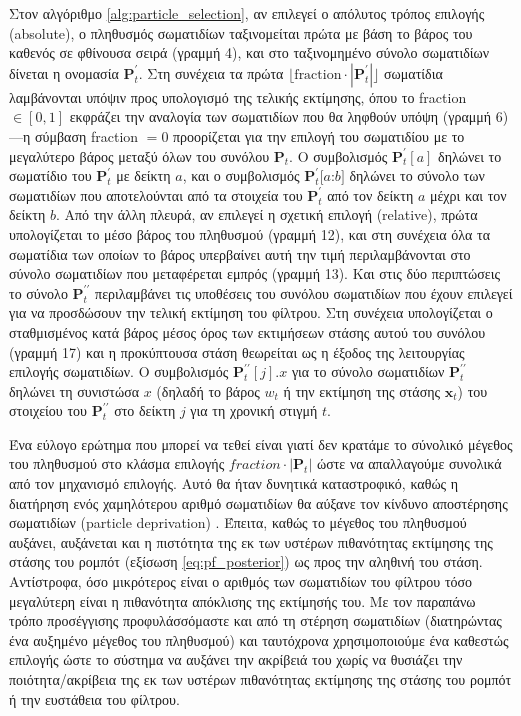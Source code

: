 Στον αλγόριθμο \ref{alg:particle_selection}, αν επιλεγεί ο απόλυτος τρόπος
επιλογής (absolute), ο πληθυσμός σωματιδίων ταξινομείται πρώτα με βάση το βάρος
του καθενός σε φθίνουσα σειρά (γραμμή 4), και στο ταξινομημένο σύνολο
σωματιδίων δίνεται η ονομασία $\bm{P}_t^\prime$. Στη συνέχεια τα πρώτα $\lfloor
\text{fraction}\cdot|\bm{P}_t^\prime| \rfloor$ σωματίδια λαμβάνονται υπόψιν
προς υπολογισμό της τελικής εκτίμησης, όπου το fraction $\in [0,1]$ εκφράζει
την αναλογία των σωματιδίων που θα ληφθούν υπόψη (γραμμή 6)---η σύμβαση
fraction $=0$ προορίζεται για την επιλογή του σωματιδίου με το μεγαλύτερο βάρος
μεταξύ όλων του συνόλου $\bm{P}_t$. Ο συμβολισμός $\bm{P}_t^\prime[a]$ δηλώνει
το σωματίδιο του $\bm{P}_t^\prime$ με δείκτη $a$, και ο συμβολισμός
$\bm{P}_t^\prime[a$:$b]$ δηλώνει το σύνολο των σωματιδίων που αποτελούνται από
τα στοιχεία του $\bm{P}_t^\prime$ από τον δείκτη $a$ μέχρι και τον δείκτη $b$.
Από την άλλη πλευρά, αν επιλεγεί η σχετική επιλογή (relative), πρώτα
υπολογίζεται το μέσο βάρος του πληθυσμού (γραμμή 12), και στη συνέχεια όλα τα
σωματίδια των οποίων το βάρος υπερβαίνει αυτή την τιμή περιλαμβάνονται στο
σύνολο σωματιδίων που μεταφέρεται εμπρός (γραμμή 13).  Και στις δύο περιπτώσεις
το σύνολο $\bm{P}_t^{\prime\prime}$ περιλαμβάνει τις υποθέσεις του συνόλου
σωματιδίων που έχουν επιλεγεί για να προσδώσουν την τελική εκτίμηση του
φίλτρου.  Στη συνέχεια υπολογίζεται ο σταθμισμένος κατά βάρος μέσος όρος των
εκτιμήσεων στάσης αυτού του συνόλου (γραμμή 17) και η προκύπτουσα στάση
θεωρείται ως η έξοδος της λειτουργίας επιλογής σωματιδίων. Ο συμβολισμός
$\bm{P}_t^{\prime\prime}[j].x$ για το σύνολο σωματιδίων
$\bm{P}_t^{\prime\prime}$ δηλώνει τη συνιστώσα $x$ (δηλαδή το βάρος $w_t$ ή την
εκτίμηση της στάσης $\hat{\bm{x}}_t$) του στοιχείου του
$\bm{P}_t^{\prime\prime}$ στο δείκτη $j$ για τη χρονική στιγμή $t$.

Ένα εύλογο ερώτημα που μπορεί να τεθεί είναι γιατί δεν κρατάμε το σύνολικό
μέγεθος του πληθυσμού στο κλάσμα επιλογής $fraction \cdot |\bm{P}_t|$ ώστε να
απαλλαγούμε συνολικά από τον μηχανισμό επιλογής. Αυτό θα ήταν δυνητικά
καταστροφικό, καθώς η διατήρηση ενός χαμηλότερου αριθμό σωματιδίων θα αύξανε
τον κίνδυνο αποστέρησης σωματιδίων (particle deprivation)
\cite{thrun2005probabilistic}. Έπειτα, καθώς το μέγεθος του πληθυσμού αυξάνει,
αυξάνεται και η πιστότητα της εκ των υστέρων πιθανότητας εκτίμησης της στάσης
του ρομπότ (εξίσωση \ref{eq:pf_posterior}) ως προς την αληθινή του στάση.
Αντίστροφα, όσο μικρότερος είναι ο αριθμός των σωματιδίων του φίλτρου τόσο
μεγαλύτερη είναι η πιθανότητα απόκλισης της εκτίμησής του. Με τον παραπάνω
τρόπο προσέγγισης προφυλάσσόμαστε και από τη στέρηση σωματιδίων (διατηρώντας
ένα αυξημένο μέγεθος του πληθυσμού) και ταυτόχρονα χρησιμοποιούμε ένα καθεστώς
επιλογής ώστε το σύστημα να αυξάνει την ακρίβειά του χωρίς να θυσιάζει την
ποιότητα/ακρίβεια της εκ των υστέρων πιθανότητας εκτίμησης της στάσης του
ρομπότ ή την ευστάθεια του φίλτρου.

